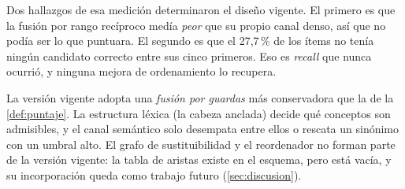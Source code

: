 Dos hallazgos de esa medición determinaron el diseño vigente. El primero es
que la fusión por rango recíproco \cite{cormack2009rrf} medía \emph{peor} que
su propio canal denso, así que no podía ser lo que puntuara. El segundo es que
el 27,7\,\% de los ítems no tenía ningún candidato correcto entre sus cinco
primeros. Eso es \emph{recall} que nunca ocurrió, y ninguna mejora de
ordenamiento lo recupera.

La versión vigente adopta una \emph{fusión por guardas} más conservadora que
la de la \cref{def:puntaje}. La estructura léxica (la cabeza anclada) decide
qué conceptos son admisibles, y el canal semántico solo desempata entre ellos
o rescata un sinónimo con un umbral alto. El grafo de sustituibilidad y el
reordenador no forman parte de la versión vigente: la tabla de aristas existe
en el esquema, pero está vacía, y su incorporación queda como trabajo futuro
(\cref{sec:discusion}).

